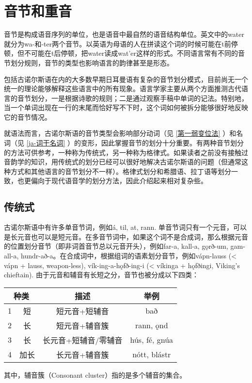 \section{音节和重音}
\label{sec:accent}

音节是构成语音序列的单位，也是语音中最自然的语音结构单位。英文中的water就分为wa-和-ter两个音节。以英语为母语的人在拼读这个词的时候可能在t前停顿，但不可能在t后停顿，把water读成wat'er这样的形式。不同语言常有不同的音节划分规则，音节的类型也影响语言的韵律甚至是形态。

包括古诺尔斯语在内的大多数早期日耳曼语有复杂的音节划分模式，目前尚无一个统一的理论能够解释这些语言中的所有现象。语言学家主要从两个方面推测古代语言的音节划分，一是根据诗歌的规则；二是通过观察手稿中单词的记法。特别地，当一个单词出现在一行的末尾而恰好写不下时，这个词如何被拆分能够很好地反映它的音节情况。

就语法而言，古诺尔斯语的音节类型会影响部分动词（见 \ref{第一弱变位法} ）和名词（见 \ref{ja-词干名词} ）的变形，因此掌握音节的划分十分重要。有两种音节划分的方法可供参考，一种称为传统式，另一种称为格律式。如果读者之前没有接触过音韵学的知识，用传统式的划分已经可以很好地解决古诺尔斯语的问题（但通常这种方式和其他语言的音节划分不一样）。格律式划分和希腊语、拉丁语等划分一致，也更偏向于现代语音学的划分方法，因此介绍起来相对复杂些。

\subsection{传统式}

古诺尔斯语中有许多单音节词，例如á, til, at, rann. 单音节词只有一个元音，可以是长元音也可以是短元音。在多音节词中，如果这个词不是合成词，那么根据元音的位置划分音节（即非词首音节总以元音开头），例如far-a, kall-a, gǫrð-um, gam-all-a, hundr-að-a。在合成词中，根据组词的语素划分音节，例如vápn-lauss (< vápn + lauss, weapon-less), vík-ing-a-hǫfð-ing-i (< víkinga + hǫfðingi, Viking's chieftain). 由于元音和辅音有长短之分，音节也被分成以下四类：

\begin{table}[H]
  \centering
  \begin{tabular}{@{}cccc@{}}
    \toprule
    \multicolumn{2}{c}{\textbf{种类}} & \textbf{描述} & \textbf{举例}                  \\ \midrule
    1                               & 短           & 短元音+短辅音     & bað            \\
    2                               & 长           & 短元音+辅音簇     & rann, ǫnd      \\
    3                               & 长           & 长元音+短辅音/零辅音 & hús, fé, gnúa  \\
    4                               & 加长          & 长元音+辅音簇     & nótt,   blástr \\ \bottomrule
  \end{tabular}
\end{table}
其中，辅音簇（Consonant cluster）指的是多个辅音的集合。

